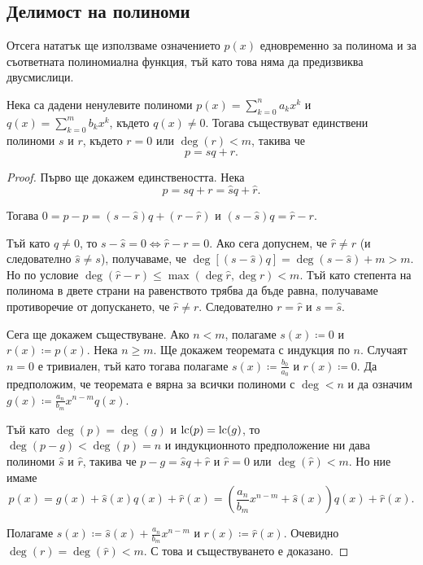 \documentclass[numbers=endperiod, DIV=15, bibliography=totocnumbered]{scrartcl}
\begin{document}
\subsection{Делимост на полиноми}

Отсега нататък ще използваме означението $p(x)$ едновременно за полинома и за съответната полиномиална функция, тъй като това няма да предизвиква двусмислици.

\begin{theorem}
  Нека са дадени ненулевите полиноми $p(x) = \sum_{k=0}^n a_k x^k$ и $q(x) = \sum_{k=0}^m b_k x^k$, където $q(x) \neq 0$. Тогава съществуват единствени полиноми $s$ и $r$, където $r = 0$ или $\deg(r) < m$, такива че
  \begin{displaymath}
    p = sq + r.
  \end{displaymath}
\end{theorem}
\begin{proof}
  Първо ще докажем единствеността. Нека
  \begin{displaymath}
    p = sq + r = \hat sq + \hat r.
  \end{displaymath}

  Тогава $0 = p - p = (s - \hat s) q + (r - \hat r)$ и $(s - \hat s) q = \hat r - r$.

  Тъй като $q \neq 0$, то $s - \hat s = 0 \iff \hat r - r = 0$. Ако сега допуснем, че $\hat r \neq r$ (и следователно $\hat s \neq s$), получаваме, че $\deg[(s - \hat s) q] = \deg(s - \hat s) + m > m$. Но по условие $\deg(\hat r - r) \leq \max(\deg \hat r, \deg r) < m$. Тъй като степента на полинома в двете страни на равенството трябва да бъде равна, получаваме противоречие от допускането, че $\hat r \neq r$. Следователно $r = \hat r$ и $s = \hat s$.

  Сега ще докажем съществуване. Ако $n < m$, полагаме $s(x) \coloneqq 0$ и $r(x) \coloneqq p(x)$. Нека $n \geq m$. Ще докажем теоремата с индукция по $n$. Случаят $n = 0$ е тривиален, тъй като тогава полагаме $s(x) \coloneqq \frac {b_0} {a_0}$ и $r(x) \coloneqq 0$. Да предположим, че теоремата е вярна за всички полиноми с $\deg < n$ и да означим $g(x) \coloneqq \frac {a_n} {b_m} x^{n-m} q(x)$.

  Тъй като $\deg(p) = \deg(g)$ и $\operatorname{lc}(p) = \operatorname{lc}(g)$, то $\deg(p - g) < \deg(p) = n$ и индукционното предположение ни дава полиноми $\hat s$ и $\hat r$, такива че $p - g = \hat s q + \hat r$ и $\hat r = 0$ или $\deg(\hat r) < m$. Но ние имаме
  \begin{displaymath}
    p(x)
    =
    g(x) + \hat s(x) q(x) + \hat r(x)
    =
    \left( \frac {a_n} {b_m} x^{n-m} + \hat s(x) \right) q(x) + \hat r(x).
  \end{displaymath}

  Полагаме $s(x) \coloneqq \hat s(x) + \frac {a_n} {b_m} x^{n-m}$ и $r(x) \coloneqq \hat r(x)$. Очевидно $\deg(r) = \deg(\hat r) < m$. С това и съществуването е доказано.
\end{proof}
\end{document}
